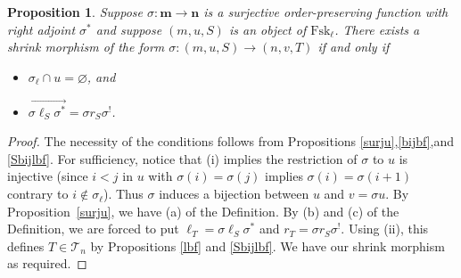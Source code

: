 \documentclass[a4paper,12pt,reqno]{amsart}
\newtheorem{proposition}[theorem]{Proposition}
\theoremstyle{definition}
\theoremstyle{fact}
\theoremstyle{genquest}
\theoremstyle{step}
\newcommand{\lra}{\longrightarrow}
\newcommand{\ora}{\overrightarrow}
\def\CT{{\mathscr T}}
\def\ordm{{\mathbf{m}}}
\def\ordn{{\mathbf{n}}}
\begin{document}
\begin{proposition}
Suppose $\sigma :\ordm \lra \ordn$ is a surjective order-preserving function
with right adjoint $\sigma^*$ and suppose $(m,u,S)$ is an object of $\mathrm{Fsk}_{\ell}$.
There exists a shrink morphism of the form $\sigma : (m,u,S) \lra (n,v,T)$ 
if and only if
\begin{itemize}
\item[(i)] $\sigma_{\ell}\cap u = \varnothing$, and
\item[(ii)] $\ora{\sigma \ell_S \sigma^*} = \sigma r_S \sigma^!$.
\end{itemize}
\end{proposition}
\begin{proof}
The necessity of the conditions follows from
Propositions \ref{surju},\ref{bijbf},and \ref{Sbijlbf}. 
For sufficiency, notice that (i) implies the restriction of 
$\sigma$ to $u$ is injective (since $i<j$ in $u$ with $\sigma(i)=\sigma(j)$
implies $\sigma(i)=\sigma(i+1)$ contrary to $i\notin \sigma_{\ell}$).  
Thus $\sigma$ induces a bijection between $u$ and $v=\sigma u$. 
By Proposition~\ref{surju}, we have (a) of the Definition.
By (b) and (c) of the Definition, we are forced to put
$\ell_T = \sigma \ell_S \sigma^*$ and $r_T = \sigma r_S \sigma^!$.
Using (ii), this defines $T\in \CT_n$ by Propositions \ref{lbf} and \ref{Sbijlbf}.  
We have our shrink morphism as required.
\end{proof}
\end{document}
